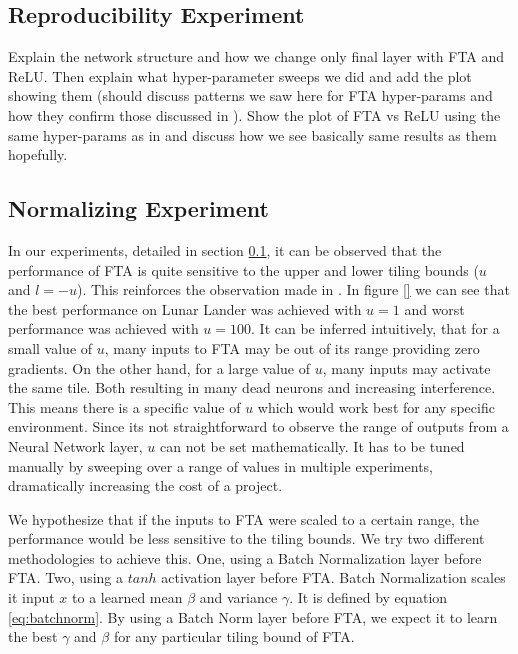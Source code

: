 \documentclass{article}
\begin{document}
\subsection{Reproducibility Experiment} \label{sub-sec:reproduc experiments}
Explain the network structure and how we change only final layer with FTA and ReLU.
Then explain what hyper-parameter sweeps we did and add the plot showing them (should discuss patterns we saw here for FTA hyper-params and how they confirm those discussed in \cite[]{pan2019fuzzy}).
Show the plot of FTA vs ReLU using the same hyper-params as in \cite[]{pan2019fuzzy} and discuss how we see basically same results as them hopefully.

\subsection{Normalizing Experiment} \label{sub-sec:normalize experiments}
In our experiments, detailed in section \ref{sub-sec:reproduc experiments}, it can be observed that the performance of FTA is quite sensitive to the upper and lower tiling bounds ($u$ and $l=-u$). This reinforces the observation made in \cite{pan2019fuzzy}. In figure \ref{} we can see that the best performance on Lunar Lander was achieved with $u=1$ and worst performance was achieved with $u=100$. It can be inferred intuitively, that for a small value of $u$, many inputs to FTA may be out of its range providing zero gradients. On the other hand, for a large value of $u$, many inputs may activate the same tile. Both resulting in many dead neurons and increasing interference. This means there is a specific value of $u$ which would work best for any specific environment. Since its not straightforward to observe the range of outputs from a Neural Network layer, $u$ can not be set mathematically. It has to be tuned manually by sweeping over a range of values in multiple experiments, dramatically increasing the cost of a project.

We hypothesize that if the inputs to FTA were scaled to a certain range, the performance would be less sensitive to the tiling bounds. We try two different methodologies to achieve this. One, using a Batch Normalization \cite[]{ioffe2015batch} layer before FTA. Two, using a $tanh$ activation layer before FTA. Batch Normalization scales it input $x$ to a learned mean $\beta$ and variance $\gamma$. It is defined by equation \ref{eq:batchnorm}. By using a Batch Norm layer before FTA, we expect it to learn the best $\gamma$ and $\beta$ for any particular tiling bound of FTA.
\end{document}
